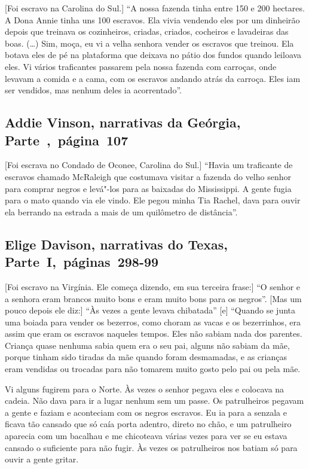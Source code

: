[Foi escravo na Carolina do Sul.] ``A nossa fazenda tinha entre 150 e 200 hectares. A Dona Annie tinha uns 100 escravos. Ela vivia vendendo eles por um dinheirão depois que
treinava os cozinheiros, criadas, criados, cocheiros e lavadeiras das
boas. (\ldots{}) Sim, moça, eu vi a velha senhora vender os escravos que
treinou. Ela botava eles de pé na plataforma que deixava no pátio dos
fundos quando leiloava eles. Vi vários traficantes passarem pela nossa
fazenda com carroças, onde levavam a comida e a cama, com os escravos
andando atrás da carroça. Eles iam ser vendidos, mas nenhum deles ia
acorrentado''.

\subsection{Addie Vinson, narrativas da Geórgia, Parte~,~página~107}
\label{ref268}

{[}Foi escrava no Condado de Oconee, Carolina do Sul.{]} ``Havia um traficante de escravos chamado McRaleigh que costumava
visitar a fazenda do velho senhor para comprar negros e levá"-los para as
baixadas do Mississippi. A gente fugia para o mato quando via ele vindo.
Ele pegou minha Tia Rachel, dava para ouvir ela berrando na estrada a
mais de um quilômetro de distância''.

\subsection{Elige Davison, narrativas do Texas, Parte~I,~páginas~298-99}

{[}Foi escravo na Virgínia. Ele começa dizendo, em sua terceira frase:{]} ``O senhor e a senhora
eram brancos muito bons e eram muito bons para os negros''. {[}Mas um
pouco depois ele diz:{]} ``Às vezes a gente levava chibatada'' {[}e{]}
``Quando se junta uma boiada para vender os bezerros, como choram as
vacas e os bezerrinhos, era assim que eram os escravos naqueles tempos.
Eles não sabiam nada dos parentes. Criança quase nenhuma sabia quem era
o seu pai, alguns não sabiam da mãe, porque tinham sido tiradas da mãe
quando foram desmamadas, e as crianças eram vendidas ou trocadas para
não tomarem muito gosto pelo pai ou pela mãe.

Vi alguns fugirem para o Norte. Às vezes o senhor pegava eles e colocava
na cadeia. Não dava para ir a lugar nenhum sem um passe. Os patrulheiros
pegavam a gente e faziam e aconteciam com os negros escravos. Eu ia para %
a senzala e ficava tão cansado que só caía porta adentro, direto no
chão, e um patrulheiro aparecia com um bacalhau e me chicoteava várias
vezes para ver se eu estava cansado o suficiente para não fugir. Às
vezes os patrulheiros nos batiam só para ouvir a gente gritar.

